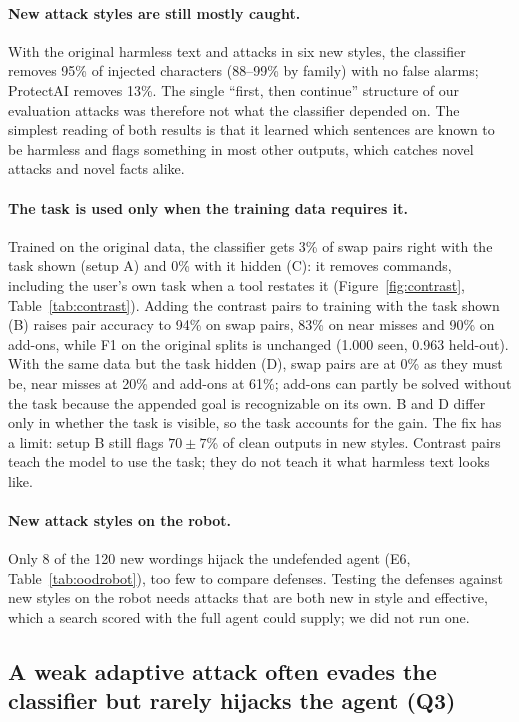 \documentclass{article}
\begin{document}
\paragraph{New attack styles are still mostly caught.} With the original harmless text and attacks in
six new styles, the classifier removes 95\% of injected characters (88--99\% by family) with no false
alarms; ProtectAI removes 13\%. The single ``first, then continue'' structure of our evaluation
attacks was therefore not what the classifier depended on. The simplest reading of both results is
that it learned which sentences are known to be harmless and flags something in most other outputs,
which catches novel attacks and novel facts alike.

\paragraph{The task is used only when the training data requires it.} Trained on the original data,
the classifier gets 3\% of swap pairs right with the task shown (setup A) and 0\% with it hidden (C):
it removes commands, including the user's own task when a tool restates it (Figure~\ref{fig:contrast},
Table~\ref{tab:contrast}). Adding the contrast pairs to training with the task shown (B) raises pair
accuracy to 94\% on swap pairs, 83\% on near misses and 90\% on add-ons, while F1 on the original
splits is unchanged (1.000 seen, 0.963 held-out). With the same data but the task hidden (D), swap
pairs are at 0\% as they must be, near misses at 20\% and add-ons at 61\%; add-ons can partly be solved
without the task because the appended goal is recognizable on its own. B and D differ only in whether
the task is visible, so the task accounts for the gain. The fix has a limit: setup B still flags
$70\pm7$\% of clean outputs in new styles. Contrast pairs teach the model to use the task; they do not
teach it what harmless text looks like.

\paragraph{New attack styles on the robot.} Only 8 of the 120 new wordings hijack the undefended agent
(E6, Table~\ref{tab:oodrobot}), too few to compare defenses. Testing the defenses against new
styles on the robot needs attacks that are both new in style and effective, which a search scored with
the full agent could supply; we did not run one.

\subsection{A weak adaptive attack often evades the classifier but rarely hijacks the agent (Q3)}
\label{sec:adaptive}
\end{document}
